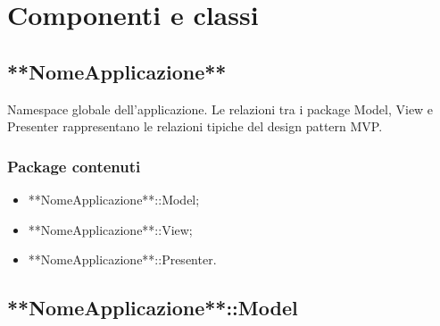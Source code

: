 \documentclass[../SpecificaTecnica.tex]{subfiles}
\begin{document}
\section{Componenti e classi}
	\subsection{**NomeApplicazione**}
	Namespace globale dell'applicazione. Le relazioni tra i package Model, View e Presenter rappresentano le relazioni tipiche del design pattern MVP.
		\subsubsection{Package contenuti}
			\begin{itemize}
				\item **NomeApplicazione**::Model;
				\item **NomeApplicazione**::View;
				\item **NomeApplicazione**::Presenter.
			\end{itemize}
	\newpage
	\subsection{**NomeApplicazione**::Model}
\end{document}
